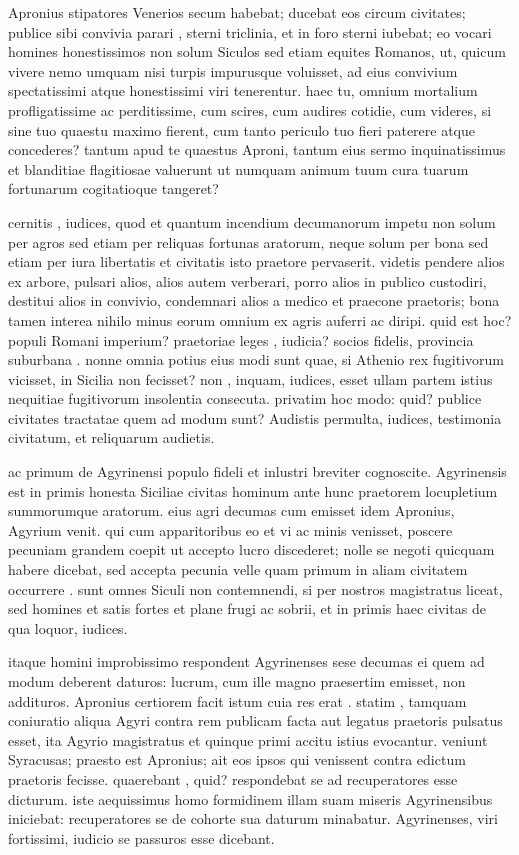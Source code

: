  Apronius stipatores Venerios secum habebat; ducebat eos circum civitates; publice sibi convivia parari , sterni triclinia, et in foro sterni iubebat; eo vocari homines honestissimos non solum Siculos sed etiam equites Romanos, ut, quicum vivere nemo umquam nisi turpis impurusque voluisset, ad eius convivium spectatissimi atque honestissimi viri tenerentur. haec tu, omnium mortalium profligatissime ac perditissime, cum scires, cum audires cotidie, cum videres, si sine tuo quaestu maximo fierent, cum tanto periculo tuo fieri paterere atque concederes? tantum apud te quaestus Aproni, tantum eius sermo inquinatissimus et blanditiae flagitiosae valuerunt ut numquam animum tuum cura tuarum fortunarum cogitatioque tangeret?

 cernitis , iudices, quod et quantum incendium decumanorum impetu non solum per agros sed etiam per reliquas fortunas aratorum, neque solum per bona sed etiam per iura libertatis et civitatis isto praetore pervaserit. videtis pendere alios ex arbore, pulsari alios, alios autem verberari, porro alios in publico custodiri, destitui alios in convivio, condemnari alios a medico et praecone praetoris; bona tamen interea nihilo minus eorum omnium ex agris auferri ac diripi. quid est hoc? populi Romani imperium? praetoriae leges , iudicia? socios fidelis, provincia suburbana . nonne omnia potius eius modi sunt quae, si Athenio rex fugitivorum vicisset, in Sicilia non fecisset? non , inquam, iudices, esset ullam partem istius nequitiae fugitivorum insolentia consecuta. privatim hoc modo: quid? publice civitates tractatae quem ad modum sunt? Audistis permulta, iudices, testimonia civitatum, et reliquarum audietis.

 ac primum de Agyrinensi populo fideli et inlustri breviter cognoscite. Agyrinensis est in primis honesta Siciliae civitas hominum ante hunc praetorem locupletium summorumque aratorum. eius agri decumas cum emisset idem Apronius, Agyrium venit. qui cum apparitoribus eo et vi ac minis venisset, poscere pecuniam grandem coepit ut accepto lucro discederet; nolle se negoti quicquam habere dicebat, sed accepta pecunia velle quam primum in aliam civitatem occurrere . sunt omnes Siculi non contemnendi, si per nostros magistratus liceat, sed homines et satis fortes et plane frugi ac sobrii, et in primis haec civitas de qua loquor, iudices.

 itaque homini improbissimo respondent Agyrinenses sese decumas ei quem ad modum deberent daturos: lucrum, cum ille magno praesertim emisset, non addituros. Apronius certiorem facit istum cuia res erat . statim , tamquam coniuratio aliqua Agyri contra rem publicam facta aut legatus praetoris pulsatus esset, ita Agyrio magistratus et quinque primi accitu istius evocantur. veniunt Syracusas; praesto est Apronius; ait eos ipsos qui venissent contra edictum praetoris fecisse. quaerebant , quid? respondebat se ad recuperatores esse dicturum. iste aequissimus homo formidinem illam suam miseris Agyrinensibus iniciebat: recuperatores se de cohorte sua daturum minabatur. Agyrinenses, viri fortissimi, iudicio se passuros esse dicebant.

